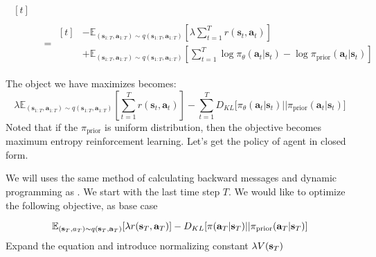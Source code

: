 \begin{equation}
\begin{aligned}
\begin{aligned}[t]
        \end{aligned} \\ 
        &= \begin{aligned}[t]
            &-\mathbb{E}_{(\boldsymbol{s}_{1:T}, \boldsymbol{a}_{1:T}) \sim q(\boldsymbol{s}_{1:T}, \boldsymbol{a}_{1:T})} \left[\lambda \sum^T_{t=1}  r(\boldsymbol{s}_t, \boldsymbol{a}_t) \right] \\
            &+ \mathbb{E}_{(\boldsymbol{s}_{1:T}, \boldsymbol{a}_{1:T}) \sim q(\boldsymbol{s}_{1:T}, \boldsymbol{a}_{1:T})} \left[ \sum^T_{t=1} \log \pi_{\theta}(\boldsymbol{a}_t | \boldsymbol{s}_t) - \log \pi_{\text{prior}}(\boldsymbol{a}_t | \boldsymbol{s}_t) \right]
        \end{aligned}
    \end{aligned}
\end{equation}

The object we have maximizes becomes:
\begin{equation}
    \lambda \mathbb{E}_{(\boldsymbol{s}_{1:T}, \boldsymbol{a}_{1:T}) \sim q(\boldsymbol{s}_{1:T}, \boldsymbol{a}_{1:T})} \left[\sum^T_{t=1}  r(\boldsymbol{s}_t, \boldsymbol{a}_t) \right] - \sum^T_{t=1} D_{KL}\Big[ \pi_{\theta} (\boldsymbol{a}_t | \boldsymbol{s}_t) \Big|\Big| \pi_{\text{prior}} (\boldsymbol{a}_t | \boldsymbol{s}_t) \Big]
\end{equation}
Noted that if the $\pi_{\text{prior}}$ is uniform distribution, then the objective becomes maximum entropy reinforcement learning. Let's get the policy of agent in closed form.


We will uses the same method of calculating backward messages and dynamic programming as \cite{levine2018reinforcement}. We start with the last time step $T$. We would like to optimize the following objective, as base case

\begin{equation}
    \mathbb{E}_{(\bold{s}_T, a_T) \sim q(\bold{s}_T, \bold{a}_T)} [\lambda  r(\bold{s}_T, \bold{a}_T)] - D_{KL} [\pi(\bold{a}_T | \bold{s}_T) || \pi_{\text{prior}}(\bold{a}_T | \bold{s}_T)]
\end{equation}
Expand the equation and introduce normalizing constant $\lambda V(\bold{s}_T)$ 

